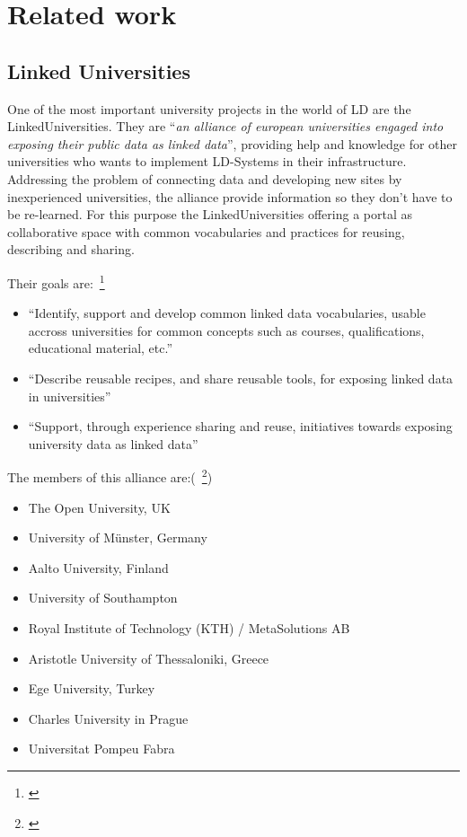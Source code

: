 \section{Related work}
\subsection{Linked Universities}\label{linkeduniversities}
One of the most important university projects in the world of LD are the LinkedUniversities. They are "`\textit{an alliance of european universities engaged into exposing their public data as linked data}"'\citet{url:linkeduniversities}, providing help and knowledge for other universities who wants to implement LD-Systems in their infrastructure. Addressing the problem of connecting data and developing new sites by inexperienced universities, the alliance provide information so they don't have to be re-learned. For this purpose the LinkedUniversities offering a portal as collaborative space with common vocabularies and practices for reusing, describing and sharing.

Their goals are:~\footnote{\citet{url:linkeduniversities}}

\begin{itemize}
\item "`Identify, support and develop common linked data vocabularies, usable accross universities for common concepts such as courses, qualifications, educational material, etc."'
\item "`Describe reusable recipes, and share reusable tools, for exposing linked data in universities"'
\item "`Support, through experience sharing and reuse, initiatives towards exposing university data as linked data"'
\end{itemize}


The members of this alliance are:(~\footnote{\citet{url:linked-universities-members}})
\begin{itemize}
	\item The Open University, UK
	\item University of M\"unster, Germany
	\item Aalto University, Finland
	\item University of Southampton
	\item Royal Institute of Technology (KTH) / MetaSolutions AB
	\item Aristotle University of Thessaloniki, Greece
	\item Ege University, Turkey
	\item Charles University in Prague
	\item Universitat Pompeu Fabra
\end{itemize}

